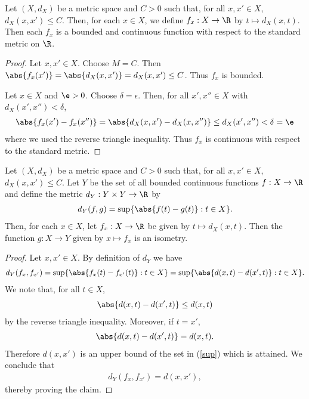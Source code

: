 \documentclass{article}
\begin{document}
\begin{claim*}[3]
	Let $(X,d_X)$ be a metric space and $C>0$ such that, for all $x,x'\in X$, $d_X(x,x')\leq C$.
	Then, for each $x\in X$, we define $f_x:X\to\R$ by $t\mapsto d_X(x,t)$. Then each $f_x$ is a
	bounded and continuous function with respect to the standard metric on $\R$.
	\begin{proof}
		Let $x,x'\in X$. Choose $M=C$. Then $\abs{f_x(x')} = \abs{d_X(x,x')} = d_X(x,x') \leq C$. Thus $f_x$ is bounded.

		Let $x\in X$ and $\e>0$. Choose $\delta=\epsilon$. Then, for all $x',x''\in X$
		with $d_X(x',x'')<\delta$,
		\begin{align*}
			\abs{f_x(x')-f_x(x'')} = \abs{d_X(x,x')-d_X(x,x'')} \leq d_X(x',x'') < \delta = \e
		\end{align*}
		where we used the reverse triangle inequality. Thus $f_x$ is continuous with respect to the
		standard metric.
	\end{proof}
\end{claim*}

\begin{claim*}[4]
	Let $(X,d_X)$ be a metric space and $C>0$ such that, for all $x,x'\in X$, $d_X(x,x')\leq C$.
	Let $Y$ be the set of all bounded continuous functions $f:X\to\R$ and define the metric
	$d_Y:Y\times Y\to\R$ by
	\begin{align*}
		d_Y(f,g) = \sup\{\abs{f(t)-g(t)}:t\in X\}.
	\end{align*}
	Then, for each $x\in X$,  let $f_x:X\to\R$ be given by $t\mapsto d_X(x,t)$. Then the function
	$g:X\to Y$ given by $x\mapsto f_x$ is an isometry.
	\begin{proof}
		Let $x,x'\in X$. By definition of $d_Y$ we have
		\begin{align}
			\label{sup}
			d_Y(f_x,f_{x'}) = \sup\{\abs{f_x(t)-f_{x'}(t)}:t\in X\}
			= \sup\{\abs{d(x,t)-d(x',t)}:t\in X\}.
		\end{align}
		We note that, for all $t\in X$,
		\begin{align*}
			\abs{d(x,t)-d(x',t)}\leq d(x,t)
		\end{align*}
		by the reverse triangle inequality. Moreover, if $t=x'$,
		\begin{align*}
			\abs{d(x,t)-d(x',t)}=d(x,t).
		\end{align*}
		Therefore $d(x,x')$ is an upper bound of the set in (\ref{sup}) which is
		attained. We conclude that
		\begin{align*}
			d_Y(f_x,f_{x'}) = d(x,x'),
		\end{align*}
		thereby proving the claim.
	\end{proof}
\end{claim*}
\end{document}
